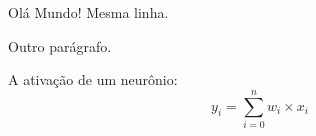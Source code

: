 \documentclass[a4paper, 12pt]{article}
\begin{document}
Olá       Mundo!
Mesma linha.

Outro parágrafo.

A ativação de um neurônio:
\begin{equation}
y_i = \sum_{i=0}^{n} w_i \times x_i
\end{equation}
\end{document}
